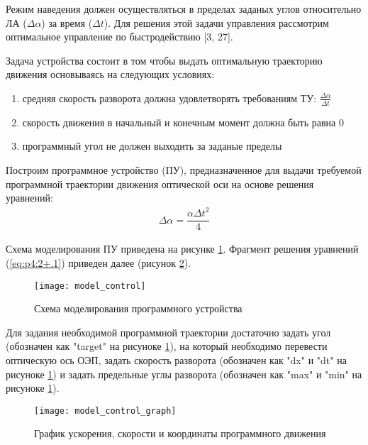 Режим наведения должен осуществляться в пределах заданых углов относительно ЛА ($\varDelta\alpha$) за время ($\varDelta t$). Для решения этой задачи управления рассмотрим оптимальное управление по быстродействию [3, 27].

Задача устройства состоит в том чтобы выдать оптимальную траекторию движения основываясь на следующих условиях:
\begin{enumerate}
	\item средняя скорость разворота должна удовлетворять требованиям ТУ: 
	$\frac{\varDelta\alpha}{\varDelta t}$
	\item скорость движения в начальный и конечным момент должна быть равна 0
	\item программный угол не должен выходить за заданые пределы
\end{enumerate}

Построим программное устройство (ПУ), предназначенное для выдачи требуемой программной траектории движения оптической оси на основе решения уравнений:
\begin{equation}
\label{eq:p4:2+.1}
\begin{alignedat}{2}
\varDelta\alpha = \dfrac{\ddot{\alpha}{\varDelta t}^2}{4}
\end{alignedat}
\end{equation}

Схема моделирования ПУ приведена на рисунке \ref{fig:model_control}. Фрагмент решения уравнений (\ref{eq:p4:2+.1}) приведен далее (рисунок \ref{fig:model_control_graph}).

\begin{figure}[ht]
	\centering
	\texttt{[image: model\_control]} 
	\caption{Схема моделирования программного устройства}
	\label{fig:model_control}
\end{figure}

Для задания необходимой программной траектории достаточно задать угол (обозначен как "target" на рисуноке \ref{fig:model_control}), на который  необходимо перевести оптическую ось ОЭП, задать скорость разворота (обозначен как "dx" и "dt" на рисуноке \ref{fig:model_control}) и задать предельные углы разворота (обозначен как "max" и "min" на рисуноке \ref{fig:model_control}). 

\begin{figure}
	\centering
	\texttt{[image: model\_control\_graph]}
	\caption{График ускорения, скорости и координаты программного движения}
	\label{fig:model_control_graph}
\end{figure}

